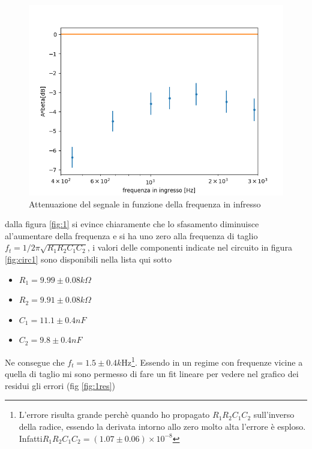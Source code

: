 \documentclass{article}
\begin{document}
	\begin{figure}
		\centering
		\includegraphics[width=\linewidth]{figure/2.png}
		\caption{Attenuazione del segnale in funzione della frequenza in infresso}
		\label{fig:2}
	\end{figure}
	dalla figura \ref{fig:1} si evince chiaramente che lo sfasamento diminuisce al'aumentare della frequenza e si ha uno zero alla frequenza di taglio $f_t=1/2\pi\sqrt{R_1R_2C_1C_2}$, i valori delle componenti indicate nel circuito in figura \ref{fig:circ1} sono disponibili nella lista qui sotto
	\begin{itemize}
		\item $R_1=9.99\pm0.08k\Omega$
		\item $R_2=9.91\pm0.08k\Omega$
		\item $C_1=11.1\pm0.4nF$
		\item $C_2=9.8\pm 0.4nF$
	\end{itemize}
	Ne consegue che $f_t=1.5\pm0.4 k$Hz\footnote{L'errore risulta grande perchè quando ho propagato $R_1R_2C_1C_2$ sull'inverso della radice, essendo la derivata intorno allo zero molto alta l'errore è esploso. Infatti\newline $R_1R_2C_1C_2=(1.07\pm 0.06)\times 10^{-8}$}. Essendo in un regime con frequenze vicine a quella di taglio mi sono permesso di fare un fit lineare per vedere nel grafico dei residui gli errori (fig \ref{fig:1res})\newline
\end{document}
